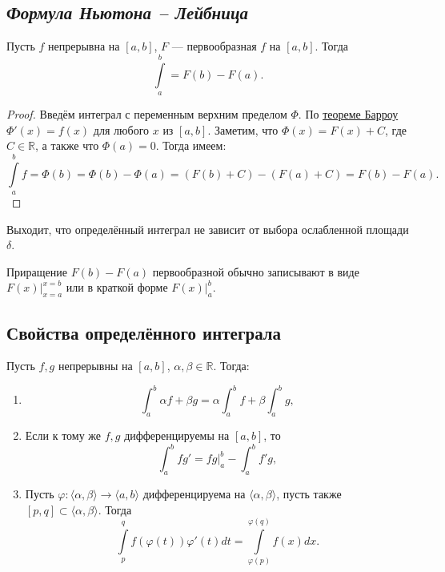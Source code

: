 \subsection{\itshape Формула Ньютона -- Лейбница}

\hypertarget{Newton}{}
\begin{theorem}
	Пусть $f$ непрерывна на $[a, b]$, $F$ --- первообразная $f$ на $[a, b]$. Тогда \[
		\int\limits_a^b = F(b) - F(a).
	\]
\end{theorem}

\begin{proof}
	Введём интеграл с переменным верхним пределом $\Phi$. По \hyperlink{Barrow}{теореме Барроу} $\Phi'(x) = f(x)$ для любого $x$ из $[a, b]$.
	Заметим, что $\Phi(x) = F(x) + C$, где $C \in \mathbb{R}$, а также что $\Phi(a) = 0$. Тогда имеем: \[
		\int\limits_a^b f = \Phi(b) = \Phi(b) - \Phi(a) = (F(b) + C) - (F(a) + C) = F(b) - F(a). 
	\]
\end{proof}

\begin{remark}
	Выходит, что определённый интеграл не зависит от выбора ослабленной площади $\delta$.
\end{remark}

\begin{remark}
	Приращение $F(b) - F(a)$ первообразной обычно записывают в виде $F(x) \bigg|_{x = a}^{x = b}$ или в краткой форме $F(x) \bigg|_a^b$.
\end{remark}

\subsection{Свойства определённого интеграла}

\begin{theorem}
	Пусть $f, g$ непрерывны на $[a, b]$, $\alpha, \beta \in \mathbb{R}$. Тогда:
	\begin{enumerate}
		\item \[
			\int_a^b \alpha f + \beta g = \alpha \int_a^b f + \beta \int_a^b g,
		\]
		\item Если к тому же $f, g$ дифференцируемы на $[a, b]$, то \[
			\int_a^b fg' = fg \bigg|_a^b - \int_a^b f'g,
		\]
		\item Пусть $\varphi: \langle \alpha, \beta \rangle \to \langle a, b \rangle$ дифференцируема на $\langle \alpha, \beta \rangle$,
		пусть также $[p, q] \subset \langle \alpha, \beta \rangle$. Тогда \[
			\int\limits_p^q f(\varphi(t))\varphi'(t) dt = \int\limits_{\varphi(p)}^{\varphi(q)} f(x) dx.
		\]
	\end{enumerate}
\end{theorem}

